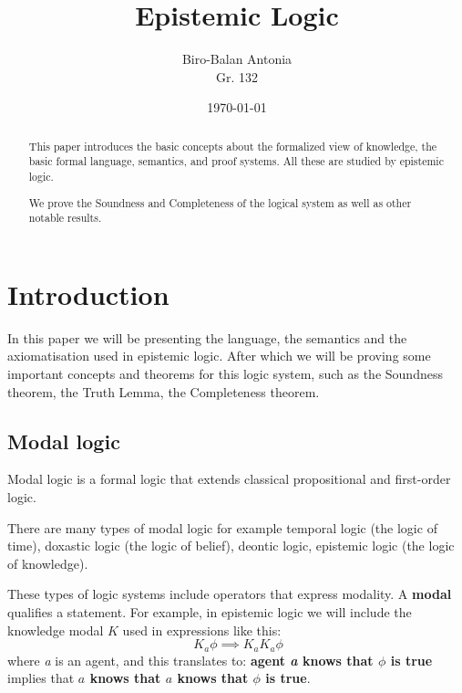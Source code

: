 \documentclass[12pt]{article}
\title{Epistemic Logic}
\author {Biro-Balan Antonia \\ Gr. 132}
\date{\small \today}
\numberwithin{equation}{section}
\theoremstyle{definition}
\theoremstyle{definition}
\theoremstyle{remark}
\begin{document}
\nocite{*}
\onehalfspacing


\maketitle
\vspace{3cm}


\begin{abstract}

This paper introduces the basic concepts about the formalized view of knowledge, the basic formal language, semantics, and proof systems. All these are studied by epistemic logic.

We prove the Soundness and Completeness of the logical system as well as other notable results.



\end{abstract}

\newpage


\tableofcontents


\section{Introduction}

In this paper we will be presenting the language, the semantics and the axiomatisation used in epistemic logic. After which we will be proving some important concepts and theorems for this logic system, such as the Soundness theorem, the Truth Lemma, the Completeness theorem.

\subsection{Modal logic}

Modal logic is a formal logic that extends classical propositional and first-order logic.

There are many types of modal logic for example temporal logic (the logic of time), doxastic logic (the logic of belief), deontic logic, epistemic logic (the logic of knowledge).

These types of logic systems include operators that express modality. A \textbf{ modal} qualifies a statement. For example, in epistemic logic we will include the knowledge modal $K$ used in expressions like this:
$$
\ K_a\phi\implies K_a K_a\phi
$$
where \textit{a} is an agent, and this translates to: \textbf{agent \textit{a} knows that $\phi$ is true} implies that \textbf{$a$ knows that $a$ knows that $\phi$ is true}.
\end{document}
